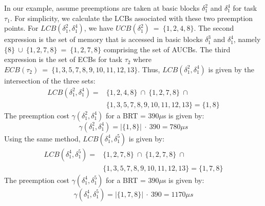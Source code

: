 \vspace{-10pt}
\newline
\noindent
In our example, assume preemptions are taken at basic blocks \begin{math}\delta_{1}^{2}\end{math} and \begin{math}\delta_{1}^{4}\end{math} for task \begin{math}\tau_{1}\end{math}. For simplicity, we calculate the LCBs associated with these two preemption points.  For $LCB(\delta_{1}^{2},\delta_{1}^{4})$, we have $UCB(\delta_{1}^{2})\ =\ \{1,2,4,8\}$.  The second expression is the set of memory that is accessed in basic blocks $\delta_{1}^{3}$ and $\delta_{1}^{4}$, namely $\{8\}\ \cup\ \{1,2,7,8\}\ =\ \{1,2,7,8\}$ comprising the set of AUCBs.  The third expression is the set of ECBs for task $\tau_{2}$ where $ECB(\tau_{2})\ =\ \{1,3,5,7,8,9,10,11,12,13\}$. Thus, $LCB(\delta_{1}^{2},\delta_{1}^{4})$ is given by the intersection of the three sets:
\begin{equation*}\label{eqn:lcb-example-1}
\begin{split}
    LCB(\delta_{1}^{2},\delta_{1}^{4}) = &\{1,2,4,8\}\ \cap\ \{1,2,7,8\}\ \cap\ \\&\{1,3,5,7,8,9,10,11,12,13\} = \{1,8\}
\end{split}
\end{equation*}
\noindent
The preemption cost $\gamma(\delta_{1}^{2},\delta_{1}^{4})$ for a BRT = $390\mu$s is given by:
\begin{equation*}\label{eqn:gamma-example-1}
    \gamma(\delta_{1}^{2},\delta_{1}^{4}) = |\{1,8\}|\ \cdot\ 390 = 780\mu\textit{s}
\end{equation*}
\noindent
Using the same method, $LCB(\delta_{1}^{4},\delta_{1}^{5})$ is given by:
\begin{equation*}\label{eqn:lcb-example-2}
\begin{split}
    LCB(\delta_{1}^{4},\delta_{1}^{5}) = &\{1,2,7,8\}\ \cap\ \{1,2,7,8\}\ \cap\ \\&\{1,3,5,7,8,9,10,11,12,13\} = \{1,7,8\}
\end{split}
\end{equation*}
\noindent
The preemption cost $\gamma(\delta_{1}^{4},\delta_{1}^{5})$ for a BRT = $390\mu$s is given by:
\begin{equation*}\label{eqn:gamma-example-1}
    \gamma(\delta_{1}^{4},\delta_{1}^{5}) = |\{1,7,8\}|\ \cdot\ 390 = 1170\mu\textit{s}
\end{equation*}
